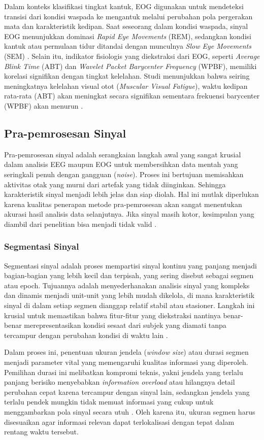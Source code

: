 Dalam konteks klasifikasi tingkat kantuk, EOG digunakan untuk mendeteksi transisi dari kondisi waspada ke mengantuk melalui perubahan pola pergerakan mata dan karakteristik kedipan. Saat seseorang dalam kondisi waspada, sinyal EOG menunjukkan dominasi \textit{Rapid Eye Movements} (REM), sedangkan kondisi kantuk atau permulaan tidur ditandai dengan munculnya \textit{Slow Eye Movements} (SEM) \cite{4977181}. Selain itu, indikator fisiologis yang diekstraksi dari EOG, seperti \textit{Average Blink Time} (ABT) dan \textit{Wavelet Packet Barycenter Frequency} (WPBF), memiliki korelasi signifikan dengan tingkat kelelahan. Studi menunjukkan bahwa seiring meningkatnya kelelahan visual otot (\textit{Muscular Visual Fatigue}), waktu kedipan rata-rata (ABT) akan meningkat secara signifikan sementara frekuensi barycenter (WPBF) akan menurun \cite{SONG2020101865}.

\subsection{Pra-pemrosesan Sinyal} \label{II.Teori1.1}
Pra-pemrosesan sinyal adalah serangkaian langkah awal yang sangat krusial dalam analisis EEG maupun EOG untuk membersihkan data mentah yang seringkali penuh dengan gangguan (\textit{noise}). Proses ini bertujuan memisahkan aktivitas otak yang murni dari artefak yang tidak diinginkan. Sehingga karakteristik sinyal menjadi lebih jelas dan siap diolah. Hal ini mutlak diperlukan karena kualitas penerapan metode pra-pemrosesan akan sangat menentukan akurasi hasil analisis data selanjutnya. Jika sinyal masih kotor, kesimpulan yang diambil dari penelitian bisa menjadi tidak valid \cite{Kim2018}. 

\subsubsection{Segmentasi Sinyal}
Segmentasi sinyal adalah proses mempartisi sinyal kontinu yang panjang menjadi bagian-bagian yang lebih kecil dan terpisah, yang sering disebut sebagai segmen atau epoch. Tujuannya adalah menyederhanakan analisis sinyal yang kompleks dan dinamis menjadi unit-unit yang lebih mudah dikelola, di mana karakteristik sinyal di dalam setiap segmen dianggap relatif stabil atau stasioner. Langkah ini krusial untuk memastikan bahwa fitur-fitur yang diekstraksi nantinya benar-benar merepresentasikan kondisi sesaat dari subjek yang diamati tanpa tercampur dengan perubahan kondisi di waktu lain \cite{5483824}.

Dalam proses ini, penentuan ukuran jendela (\textit{window size}) atau durasi segmen menjadi parameter vital yang memengaruhi kualitas informasi yang diperoleh. Pemilihan durasi ini melibatkan kompromi teknis, yakni jendela yang terlalu panjang berisiko menyebabkan \textit{information overload} atau hilangnya detail perubahan cepat karena tercampur dengan sinyal lain, sedangkan jendela yang terlalu pendek mungkin tidak memuat informasi yang cukup untuk menggambarkan pola sinyal secara utuh \cite{7320065}. Oleh karena itu, ukuran segmen harus disesuaikan agar informasi relevan dapat terlokalisasi dengan tepat dalam rentang waktu tersebut.

